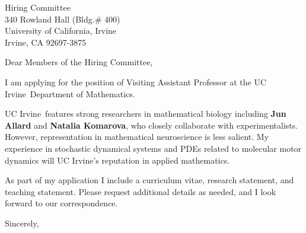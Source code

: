 \documentclass[11pt,a4paper]{letter}
\begin{document}
\def\School{UC Irvine}
\begin{letter}
{Hiring Committee\\
340 Rowland Hall (Bldg.\# 400)\\
University of California, Irvine\\
Irvine, CA 92697-3875}


\opening{Dear Members of the Hiring Committee,}

I am applying for the position of Visiting Assistant Professor at the \School~Department of Mathematics. 



\School~features strong researchers in mathematical biology including \textbf{Jun Allard} and \textbf{Natalia Komarova}, who closely collaborate with experimentalists. However, representation in mathematical neuroscience is less salient. My experience in stochastic dynamical systems and PDEs related to molecular motor dynamics will \School's reputation in applied mathematics.



As part of my application I include a curriculum vitae, research statement, and teaching statement. Please request additional details as needed, and I look forward to our correspondence.

\closing{Sincerely,}
\end{letter}
\end{document}
